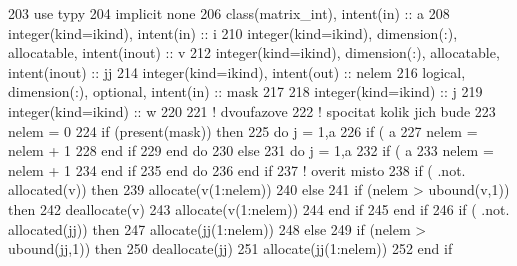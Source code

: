 \begin{DoxyCode}
203     \textcolor{keywordtype}{use }typy
204     \textcolor{keywordtype}{implicit none}
206     \textcolor{keywordtype}{class}(matrix\_int), \textcolor{keywordtype}{intent(in)} :: a
208     \textcolor{keywordtype}{integer(kind=ikind)}, \textcolor{keywordtype}{intent(in)} :: i
210     \textcolor{keywordtype}{integer(kind=ikind)}, \textcolor{keywordtype}{dimension(:)}, \textcolor{keywordtype}{allocatable}, \textcolor{keywordtype}{intent(inout)} :: v
212     \textcolor{keywordtype}{integer(kind=ikind)}, \textcolor{keywordtype}{dimension(:)}, \textcolor{keywordtype}{allocatable}, \textcolor{keywordtype}{intent(inout)} :: jj
214     \textcolor{keywordtype}{integer(kind=ikind)}, \textcolor{keywordtype}{intent(out)} :: nelem
216     \textcolor{keywordtype}{logical}, \textcolor{keywordtype}{dimension(:)}, \textcolor{keywordtype}{optional}, \textcolor{keywordtype}{intent(in)} :: mask
217 
218     \textcolor{keywordtype}{integer(kind=ikind)} :: j
219     \textcolor{keywordtype}{integer(kind=ikind)} :: w
220 
221     \textcolor{comment}{! dvoufazove
}
222     \textcolor{comment}{! spocitat kolik jich bude
}
223     nelem = 0
224     \textcolor{keywordflow}{if} (\textcolor{keyword}{present}(mask)) then
225         \textcolor{keywordflow}{do} j = 1,a%
226             \textcolor{keywordflow}{if} ( a%
227                 nelem = nelem + 1
228 \textcolor{keyword}{            end }if
229 \textcolor{keyword}{        end }do
230     else
231         \textcolor{keywordflow}{do} j = 1,a%
232             \textcolor{keywordflow}{if} ( a%
233                 nelem = nelem + 1
234 \textcolor{keyword}{            end }if
235 \textcolor{keyword}{        end }do
236 \textcolor{keyword}{    end }if
237     \textcolor{comment}{! overit misto
}
238     \textcolor{keywordflow}{if} ( .not. \textcolor{keyword}{allocated}(v)) then
239         \textcolor{keyword}{allocate}(v(1:nelem))
240     else
241         \textcolor{keywordflow}{if} (nelem > ubound(v,1)) then
242             \textcolor{keyword}{deallocate}(v)
243             \textcolor{keyword}{allocate}(v(1:nelem))
244 \textcolor{keyword}{        end }if
245 \textcolor{keyword}{    end }if
246     \textcolor{keywordflow}{if} ( .not. \textcolor{keyword}{allocated}(jj)) then
247         \textcolor{keyword}{allocate}(jj(1:nelem))
248     else
249         \textcolor{keywordflow}{if} (nelem > ubound(jj,1)) then
250             \textcolor{keyword}{deallocate}(jj)
251             \textcolor{keyword}{allocate}(jj(1:nelem))
252 \textcolor{keyword}{        end }if

\end{DoxyCode}
